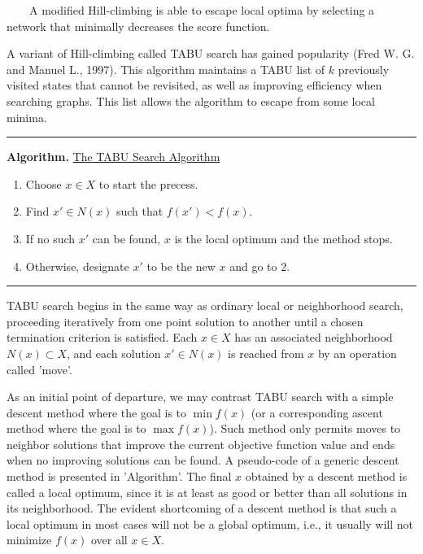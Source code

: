 ~~~~A modified Hill-climbing is able to escape local optima by selecting a network that minimally decreases the score function.

A variant of Hill-climbing called TABU search has gained popularity (Fred W. G. and Manuel L., 1997). This algorithm maintains a TABU list of $k$ previously visited states that cannot be revisited, as well as improving efficiency when searching graphs. This list allows the algorithm to escape from some local minima.

\begin{center}\rule[0.5ex]{0.9\columnwidth}{1pt}\end{center}

\textbf{Algorithm.} \underline{The TABU Search Algorithm}

\begin{enumerate}
	\item Choose $x \in X$ to start the precess.
	
	\item Find $x' \in N(x)$ such that $f(x') < f(x)$.
	
	\item If no such $x'$ can be found, $x$ is the local optimum and the method stops.
	
	\item Otherwise, designate $x'$ to be the new $x$ and go to 2.
\end{enumerate}

\begin{center}\rule[0.5ex]{0.9\columnwidth}{1pt}\end{center}

TABU search begins in the same way as ordinary local or neighborhood search, proceeding iteratively from one point solution to another until a chosen termination criterion is satisfied. Each $x \in X$ has an associated neighborhood $N(x) \subset X$, and each solution $x' \in N(x)$ is reached from $x$ by an operation called 'move'.

As an initial point of departure, we may contrast TABU search with a simple descent method where the goal is to $\min f(x)$ (or a corresponding ascent method where the goal is to $\max f(x)$). Such method only permits moves to neighbor solutions that improve the current objective function value and ends when no improving solutions can be found. A pseudo-code of a generic descent method is presented in 'Algorithm'. The final $x$ obtained by a descent method is called a local optimum, since it is at least as good or better than all solutions in its neighborhood. The evident shortcoming of a descent method is that such a local optimum in most cases will not be a global optimum, i.e., it usually will not minimize $f(x)$ over all $x \in X$.